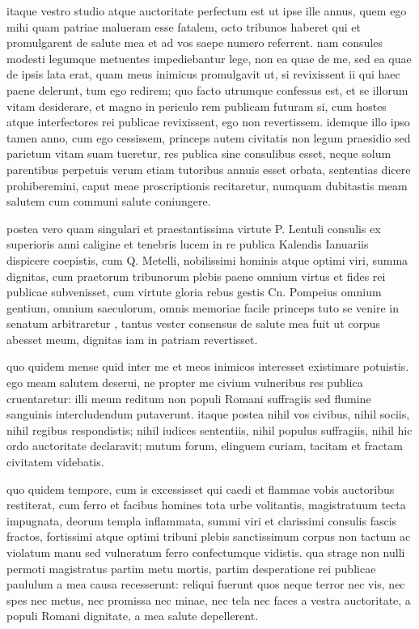  itaque vestro studio atque auctoritate perfectum est ut ipse ille annus, quem ego mihi quam patriae malueram esse fatalem, octo tribunos haberet qui et promulgarent de salute mea et ad vos saepe numero referrent. nam consules modesti legumque metuentes impediebantur lege, non ea quae de me, sed ea quae de ipsis lata erat, quam meus inimicus promulgavit ut, si revixissent ii qui haec paene delerunt, tum ego redirem; quo facto utrumque confessus est, et se illorum vitam desiderare, et magno in periculo rem publicam futuram si, cum hostes atque interfectores rei publicae revixissent, ego non revertissem. idemque illo ipso tamen anno, cum ego cessissem, princeps autem civitatis non legum praesidio sed parietum vitam suam tueretur, res publica sine consulibus esset, neque solum parentibus perpetuis verum etiam tutoribus annuis esset orbata, sententias dicere prohiberemini, caput meae proscriptionis recitaretur, numquam dubitastis meam salutem cum communi salute coniungere.

 postea vero quam singulari et praestantissima virtute P. Lentuli consulis ex superioris anni caligine et tenebris lucem in re publica Kalendis Ianuariis dispicere coepistis, cum Q. Metelli, nobilissimi hominis atque optimi viri, summa dignitas, cum praetorum tribunorum plebis paene omnium virtus et fides rei publicae subvenisset, cum virtute gloria rebus gestis Cn. Pompeius omnium gentium, omnium saeculorum, omnis memoriae facile princeps tuto se venire in senatum arbitraretur , tantus vester consensus de salute mea fuit ut corpus abesset meum, dignitas iam in patriam revertisset.

 quo quidem mense quid inter me et meos inimicos interesset existimare potuistis. ego meam salutem deserui, ne propter me civium vulneribus res publica cruentaretur: illi meum reditum non populi Romani suffragiis sed flumine sanguinis intercludendum putaverunt. itaque postea nihil vos civibus, nihil sociis, nihil regibus respondistis; nihil iudices sententiis, nihil populus suffragiis, nihil hic ordo auctoritate declaravit; mutum forum, elinguem curiam, tacitam et fractam civitatem videbatis.

 quo quidem tempore, cum is excessisset qui caedi et flammae vobis auctoribus restiterat, cum ferro et facibus homines tota urbe volitantis, magistratuum tecta impugnata, deorum templa inflammata, summi viri et clarissimi consulis fascis fractos, fortissimi atque optimi tribuni plebis sanctissimum corpus non tactum ac violatum manu sed vulneratum ferro confectumque vidistis. qua strage non nulli permoti magistratus partim metu mortis, partim desperatione rei publicae paululum a mea causa recesserunt: reliqui fuerunt quos neque terror nec vis, nec spes nec metus, nec promissa nec minae, nec tela nec faces a vestra auctoritate, a populi Romani dignitate, a mea salute depellerent.

